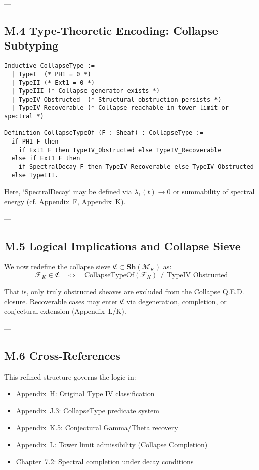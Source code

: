 \documentclass[11pt]{article}
\begin{document}
---

\subsection*{M.4 Type-Theoretic Encoding: Collapse Subtyping}

\begin{lstlisting}[language=Coq, caption={Coq: Refined CollapseType System}]
Inductive CollapseType :=
  | TypeI  (* PH1 = 0 *)
  | TypeII (* Ext1 = 0 *)
  | TypeIII (* Collapse generator exists *)
  | TypeIV_Obstructed  (* Structural obstruction persists *)
  | TypeIV_Recoverable (* Collapse reachable in tower limit or spectral *)

Definition CollapseTypeOf (F : Sheaf) : CollapseType :=
  if PH1 F then
    if Ext1 F then TypeIV_Obstructed else TypeIV_Recoverable
  else if Ext1 F then
    if SpectralDecay F then TypeIV_Recoverable else TypeIV_Obstructed
  else TypeIII.
\end{lstlisting}

Here, `SpectralDecay` may be defined via \( \lambda_1(t) \to 0 \) or summability of spectral energy (cf. Appendix~F, Appendix~K).

---

\subsection*{M.5 Logical Implications and Collapse Sieve}

We now redefine the collapse sieve \( \mathfrak{C} \subset \mathbf{Sh}(\mathcal{M}_K) \) as:
\[
\mathcal{F}_K \in \mathfrak{C} \quad \Leftrightarrow \quad \text{CollapseTypeOf}(\mathcal{F}_K) \ne \text{TypeIV\_Obstructed}
\]

That is, only truly obstructed sheaves are excluded from the Collapse Q.E.D. closure.  
Recoverable cases may enter \( \mathfrak{C} \) via degeneration, completion, or conjectural extension (Appendix~L/K).

---

\subsection*{M.6 Cross-References}

This refined structure governs the logic in:

\begin{itemize}
  \item Appendix~H: Original Type IV classification
  \item Appendix~J.3: CollapseType predicate system
  \item Appendix~K.5: Conjectural Gamma/Theta recovery
  \item Appendix~L: Tower limit admissibility (Collapse Completion)
  \item Chapter~7.2: Spectral completion under decay conditions
\end{itemize}
\end{document}
